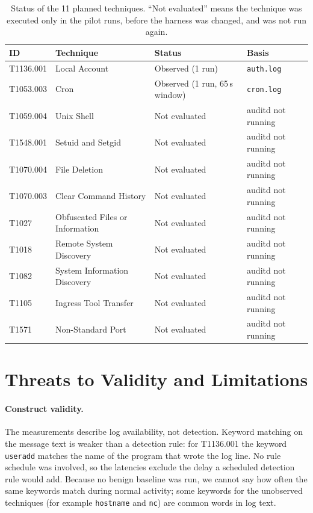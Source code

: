 \documentclass[11pt,a4paper]{article}
\begin{document}
\begin{table}[H]
    \centering
    \caption{Status of the 11 planned techniques. ``Not evaluated'' means the
    technique was executed only in the pilot runs, before the harness was
    changed, and was not run again.}
    \label{tab:status}
    \begin{tabular}{llll}
        \toprule
        \textbf{ID} & \textbf{Technique} & \textbf{Status} & \textbf{Basis} \\
        \midrule
        T1136.001 & Local Account & Observed (1 run) & \texttt{auth.log} \\
        T1053.003 & Cron & Observed (1 run, 65\,s window) & \texttt{cron.log} \\
        \midrule
        T1059.004 & Unix Shell & Not evaluated & auditd not running \\
        T1548.001 & Setuid and Setgid & Not evaluated & auditd not running \\
        T1070.004 & File Deletion & Not evaluated & auditd not running \\
        T1070.003 & Clear Command History & Not evaluated & auditd not running \\
        T1027 & Obfuscated Files or Information & Not evaluated & auditd not running \\
        T1018 & Remote System Discovery & Not evaluated & auditd not running \\
        T1082 & System Information Discovery & Not evaluated & auditd not running \\
        T1105 & Ingress Tool Transfer & Not evaluated & auditd not running \\
        T1571 & Non-Standard Port & Not evaluated & auditd not running \\
        \bottomrule
    \end{tabular}
\end{table}

\section{Threats to Validity and Limitations}
\label{sec:threats}

\paragraph{Construct validity.}
The measurements describe log availability, not detection. Keyword matching on
the message text is weaker than a detection rule: for T1136.001 the keyword
\texttt{useradd} matches the name of the program that wrote the log line. No
rule schedule was involved, so the latencies exclude the delay a scheduled
detection rule would add. Because no benign baseline was run, we cannot say
how often the same keywords match during normal activity; some keywords for
the unobserved techniques (for example \texttt{hostname} and \texttt{nc}) are
common words in log text.
\end{document}
